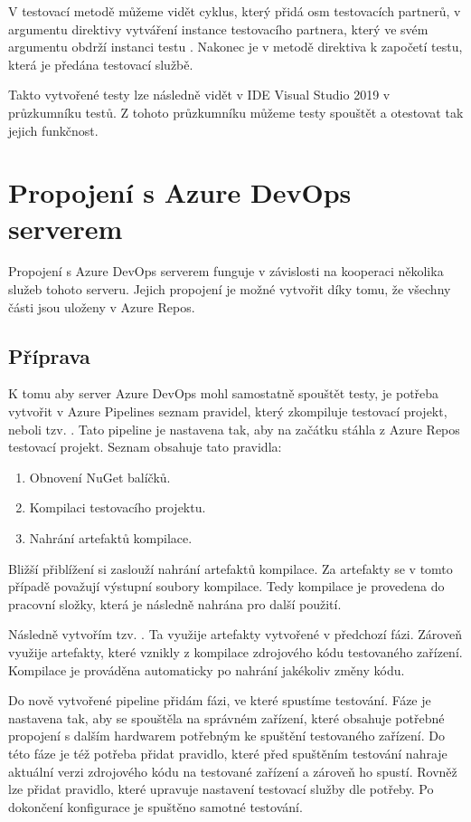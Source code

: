 V testovací metodě  můžeme vidět cyklus, který přidá osm testovacích partnerů, v argumentu direktivy vytváření instance testovacího partnera, který ve svém argumentu obdrží instanci testu . Nakonec je v metodě direktiva k započetí testu, která je předána testovací službě.

Takto vytvořené testy lze následně vidět v IDE Visual Studio 2019 v průzkumníku testů. Z tohoto průzkumníku můžeme testy spouštět a otestovat tak jejich funkčnost.  


\section{Propojení s Azure DevOps serverem}
Propojení s Azure DevOps serverem funguje v závislosti na kooperaci několika služeb tohoto serveru. Jejich propojení je možné vytvořit díky tomu, že všechny části jsou uloženy v Azure Repos. 

\subsection{Příprava}
K tomu aby server Azure DevOps mohl samostatně spouštět testy, je potřeba vytvořit v Azure Pipelines seznam pravidel, který zkompiluje testovací projekt, neboli tzv. . Tato pipeline je nastavena tak, aby na začátku stáhla z Azure Repos testovací projekt. Seznam obsahuje tato pravidla:

\begin{enumerate}
    \item Obnovení NuGet balíčků.
    \item Kompilaci testovacího projektu.
    \item Nahrání artefaktů kompilace.
\end{enumerate}

Bližší přiblížení si zaslouží nahrání artefaktů kompilace. Za artefakty se v tomto případě považují výstupní soubory kompilace. Tedy kompilace je provedena do pracovní složky, která je následně nahrána pro další použití. 

Následně vytvořím tzv. . Ta využije artefakty vytvořené v předchozí fázi.
Zároveň využije artefakty, které vznikly z kompilace zdrojového kódu testovaného zařízení. Kompilace je prováděna automaticky po nahrání jakékoliv změny kódu.

Do nově vytvořené pipeline přidám fázi, ve které spustíme testování. Fáze je nastavena tak, aby se spouštěla na správném zařízení, které obsahuje potřebné propojení s dalším hardwarem potřebným ke spuštění testovaného zařízení. Do této fáze je též potřeba přidat pravidlo, které před spuštěním testování nahraje aktuální verzi zdrojového kódu na testované zařízení a zároveň ho spustí. Rovněž lze přidat pravidlo, které upravuje nastavení testovací služby dle potřeby. Po dokončení konfigurace je spuštěno samotné testování.

